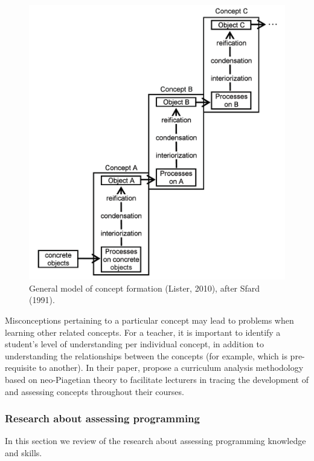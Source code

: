 \begin{figure}
\includegraphics[scale=0.8]{figures/ListerFases.png}
\caption{General model of concept formation (Lister, 2010), after Sfard (1991).}
\end{figure}\label{fig:ListerFases}


Misconceptions pertaining to a particular concept may lead to problems when learning other related concepts. For a teacher, it is important to identify a student's level of understanding per individual concept, in addition to understanding the relationships between the concepts (for example, which is pre-requisite to another). In their paper,  propose a curriculum analysis methodology based on neo-Piagetian theory to facilitate lecturers in tracing the development of and assessing concepts throughout their courses.





\subsubsection{Research about assessing programming}\label{sec:researchAssProgramming}


In this section we review of the research about assessing programming knowledge and skills.

